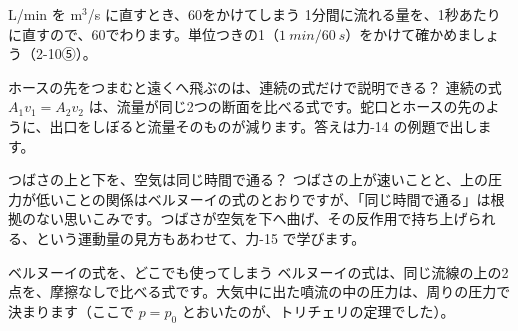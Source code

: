\begin{tsumazuki}{L/min を m$^3$/s に直すとき、60をかけてしまう}
1分間に流れる量を、1秒あたりに直すので、60でわります。単位つきの1（$\qty{1}{min}/\qty{60}{s}$）をかけて確かめましょう（2-10⑤）。
\end{tsumazuki}
\begin{tsumazuki}{ホースの先をつまむと遠くへ飛ぶのは、連続の式だけで説明できる？}
連続の式 $A_1v_1=A_2v_2$ は、流量が同じ2つの断面を比べる式です。蛇口とホースの先のように、出口をしぼると流量そのものが減ります。答えは力-14 の例題で出します。
\end{tsumazuki}
\begin{tsumazuki}{つばさの上と下を、空気は同じ時間で通る？}
つばさの上が速いことと、上の圧力が低いことの関係はベルヌーイの式のとおりですが、「同じ時間で通る」は根拠のない思いこみです。つばさが空気を下へ曲げ、その反作用で持ち上げられる、という運動量の見方もあわせて、力-15 で学びます。
\end{tsumazuki}
\begin{tsumazuki}{ベルヌーイの式を、どこでも使ってしまう}
ベルヌーイの式は、同じ流線の上の2点を、摩擦なしで比べる式です。大気中に出た噴流の中の圧力は、周りの圧力で決まります（ここで $p=p_0$ とおいたのが、トリチェリの定理でした）。
\end{tsumazuki}

